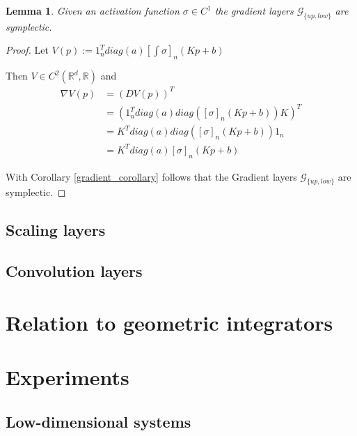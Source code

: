 \documentclass[twoside,a4paper]{article}
\begin{document}
\newtheorem*{glayer}{Lemma}
\begin{glayer}
	Given an activation function $\sigma \in C^1$ the gradient layers $\mathcal{G}_{\{up,low\}}$ 
	are symplectic.
\end{glayer}
\begin{proof}
	Let $V(p) := 1_n^Tdiag(a)[\int \sigma]_n(Kp+b)$ 

	Then $V \in C^2(\mathbb{R}^d, \mathbb{R})$ and
	\begin{align*}
		\nabla V(p) &= \left(DV(p)\right)^T \\
		&= \left(1_n^Tdiag(a)diag\left([\sigma]_n(Kp+b)\right)K\right)^T \\
		&= K^Tdiag(a)diag\left([\sigma]_n(Kp+b)\right)1_n \\
		&= K^Tdiag(a)[\sigma]_n(Kp+b)
	\end{align*}

	With Corollary \ref{gradient_corollary} follows that the Gradient layers $\mathcal{G}_{\{up,low\}}$
	are symplectic. 
\end{proof}

\subsection{Scaling layers}

\subsection{Convolution layers}



\section{Relation to geometric integrators}

\section{Experiments}

\subsection{Low-dimensional systems}
\end{document}
